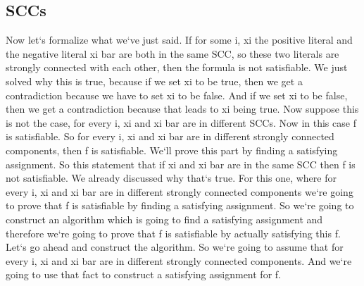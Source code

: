 \subsection{SCCs}
Now let`s formalize what we`ve just said.
If for some i, xi the positive literal and the negative literal xi bar are both in the same SCC, so these two literals are strongly connected with each other, then the formula is not satisfiable.
We just solved why this is true, because if we set xi to be true, then we get a contradiction because we have to set xi to be false.
And if we set xi to be false, then we get a contradiction because that leads to xi being true.
Now suppose this is not the case, for every i, xi and xi bar are in different SCCs.
Now in this case f is satisfiable.
So for every i, xi and xi bar are in different strongly connected components, then f is satisfiable.
We`ll prove this part by finding a satisfying assignment.
So this statement that if xi and xi bar are in the same SCC then f is not satisfiable.
We already discussed why that`s true.
For this one, where for every i, xi and xi bar are in different strongly connected components we`re going to prove that f is satisfiable by finding a satisfying assignment.
So we`re going to construct an algorithm which is going to find a satisfying assignment and therefore we`re going to prove that f is satisfiable by actually satisfying this f.
Let`s go ahead and construct the algorithm.
So we`re going to assume that for every i, xi and xi bar are in different strongly connected components.
And we`re going to use that fact to construct a satisfying assignment for f.

